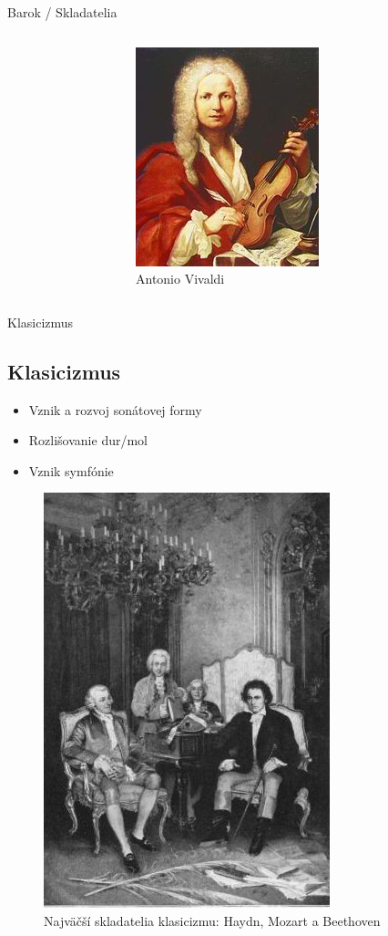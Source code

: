 \documentclass[dvipsnames]{beamer}
\begin{document}
\begin{frame}{\small \textcolor{g}{Barok} / \Large Skladatelia}
\begin{columns}
\begin{figure}
	\end{figure}%
	\begin{figure}
		\includegraphics[scale=1.75]{vivaldi}
		\caption{Antonio Vivaldi}
	\end{figure}

	\end{columns}
\end{frame}
\begin{frame}{Klasicizmus}
	\subsection{Klasicizmus}
	\begin{itemize}
		\item Vznik a rozvoj sonátovej formy
		\item Rozlišovanie dur/mol
		\item Vznik symfónie
		
	\end{itemize}
	\begin{figure}
		\includegraphics[scale=0.3]{klasmu}
		\caption{Najväčší skladatelia klasicizmu: Haydn, Mozart a Beethoven}
	\end{figure}
\end{frame}
\end{document}
